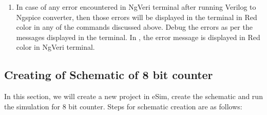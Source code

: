 \begin{enumerate}
\item In case of any error encountered in NgVeri terminal after running Verilog to Ngspice converter, then those errors will be displayed in the terminal in Red color in any of the commands discussed above. Debug the errors as per the messages displayed in the terminal. In , the error message is displayed in Red color in NgVeri terminal. 

\end{enumerate}

\subsection {Creating of Schematic of 8 bit counter}

In this section, we will create a new project in eSim, create the schematic and run the simulation for 8 bit counter. Steps for schematic creation are as follows:


